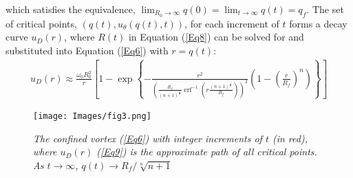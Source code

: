 \documentclass{article}
\begin{document}
which satisfies the equivalence, $\displaystyle \lim_{R_0 \to \infty} q(0) =\displaystyle \lim_{t \to \infty} q(t)=q_f$. The set of critical points, $(q(t), u_\theta (q(t),t))$, for each increment of $t$ forms a decay curve $u_D(r)$, where $R(t)$ in Equation (\ref{Eq8}) can be solved for and substituted into Equation (\ref{Eq6}) with $r=q(t)$:
\begin{align}\label{Eq9}
    u_D (r) \approx \frac{\omega_{0}R_{0}^{2}}{r}\left[ 1-\exp \left\{ -\frac{r^{2}}{\left( \frac{R_{f}}{\left(n+1\right)^{\frac{1}{n}}}\operatorname{erf}^{-1}\left(r\frac{\left(n+1\right)^{\frac{1}{n}}}{R_{f}}\right) \right)^{2}}\left(1-\left(\frac{r}{R_{f}}\right)^{n}\right) \right\}\right]
\end{align}


\begin{figure}[h]
    \centering
    \texttt{[image: Images/fig3.png]}
    \caption{\textit{The confined vortex (\ref{Eq6}) with integer increments of $t$ (in red), where $u_D(r)$ (\ref{Eq9}) is the approximate path of all critical points. As $t\to \infty$, $q(t)\to R_f/\sqrt[n]{n+1}$}}
    \label{fig:enter-label}
\end{figure}
\newpage
\end{document}
